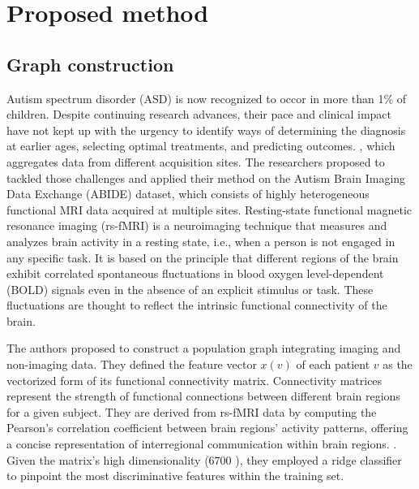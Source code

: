 

\section{Proposed method}

\subsection{Graph construction} 


Autism spectrum disorder (ASD) is now recognized to occor in more than 1\% of children. Despite continuing research advances, their pace and clinical impact have not kept up with the urgency to identify ways of determining the diagnosis at earlier ages, selecting optimal treatments, and predicting outcomes. , which aggregates data from different acquisition sites. The researchers \cite{Parisot17} proposed to tackled those challenges and applied their method on the Autism Brain Imaging Data Exchange (ABIDE) dataset, which consists of highly heterogeneous functional MRI data acquired at multiple sites. Resting-state functional magnetic resonance imaging (rs-fMRI) is a neuroimaging technique that measures and analyzes brain activity in a resting state, i.e., when a person is not engaged in any specific task. 
It is based on the principle that different regions of the brain exhibit correlated spontaneous fluctuations in blood oxygen level-dependent (BOLD) signals even in the absence of an explicit stimulus or task. These fluctuations are thought to reflect the intrinsic functional connectivity of the brain. 

The authors \cite{Parisot17} proposed to construct a population graph integrating imaging and non-imaging data. 
They defined the feature vector $x(v)$ of each patient $v$ as the vectorized form of its functional connectivity matrix. Connectivity matrices represent the strength of functional connections between different brain regions for a given subject. They are derived from rs-fMRI data by computing the Pearson's correlation coefficient between brain regions' activity patterns, offering a concise representation of interregional communication within brain regions. . Given the matrix's high dimensionality (6700 ), they employed a ridge classifier to pinpoint the most discriminative features within the training set. 

